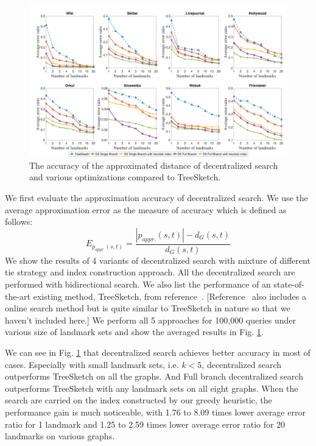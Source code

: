 \begin{figure}[t]
    \centering
    \includegraphics[width=\linewidth]{./figures/accuracy_stepy.pdf}
    \caption{The accuracy of the approximated distance of decentralized search and various optimizations compared to TreeSketch.}
    \label{fig:accuracy_stepy}
\end{figure}

We first evaluate the approximation accuracy of decentralized search. We use the average approximation error as the measure of accuracy which is defined as follows:
\[
E_{p_{appr.}(s,t)} = \frac{|p_{appr.}(s,t)| - d_G(s,t)}{d_G(s,t)}
\]
We show the results of 4 variants of decentralized search with mixture of different tie strategy and index construction approach. All the decentralized search are performed with bidirectional search. We also list the performance of an state-of-the-art existing method, TreeSketch, from reference~\cite{Gubichev:2010:FAE:1871437.1871503}. [Reference~\cite{6399472} also includes a online search method but is quite similar to TreeSketch in nature so that we haven't included here.] We perform all 5 approaches for 100,000 queries under various size of landmark sets and show the averaged results in Fig. \ref{fig:accuracy_stepy}.

We can see in Fig. \ref{fig:accuracy_stepy} that decentralized search achieves better accuracy in most of cases. Especially with small landmark sets, i.e. $k < 5$, decentralized search outperforms TreeSketch on all the graphs. And Full branch decentralized search outperforms TreeSketch with any landmark sets on all eight graphs. When the search are carried on the index constructed by our greedy heuristic, the performance gain is much noticeable, with 1.76 to 8.09 times lower average error ratio for 1 landmark and 1.25 to 2.59 times lower average error ratio for 20 landmarks on various graphs.

